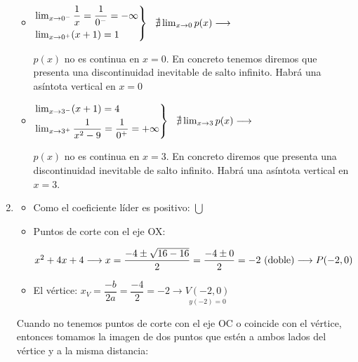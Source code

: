 \begin{enumerate}[label=\color{red}\textbf{\arabic*)}, leftmargin=*]
\begin{itemize}[label=]
	\item {}
	\begin{center}
		$\begin{rcases}
			\lim_{x\to0^-}\dfrac{1}{x}=\dfrac{1}{0^-}=-\infty\\
			\lim_{x\to0^+}(x+1)=1
		\end{rcases}~~\nexists \lim_{x\to0}p(x)\longrightarrow~~$\begin{minipage}[t]{0.4\textwidth}
		$p(x)$ no es continua en $x=0$. En concreto tenemos diremos que presenta una discontinuidad inevitable de salto infinito. Habrá una asíntota vertical en $x=0$
		\end{minipage}
	\end{center}
	\item {}
	\begin{center}
		$\begin{rcases}
			\lim_{x\to3^-}(x+1)=4\\
			\lim_{x\to3^+}\dfrac{1}{x^2-9}=\dfrac{1}{0^+}=+\infty
		\end{rcases}~~\nexists \lim_{x\to3}p(x)\longrightarrow$\begin{minipage}[t]{0.4\textwidth}
		$p(x)$ no es continua en $x=3$. En concreto diremos que presenta una discontinuidad inevitable de salto infinito. Habrá una asíntota vertical en $x=3$.
		\end{minipage}
	\end{center}
\end{itemize}
\item {}

\begin{minipage}{0.45\textwidth}
	\begin{itemize}[leftmargin=*]
		\item Como el coeficiente líder es positivo: $\bigcup$
		\item Puntos de corte con el eje OX:
		\begin{center}
			$ x^2+4x+4\longrightarrow x=\dfrac{-4\pm\sqrt{16-16}}{2}\linebreak=\dfrac{-4\pm0}{2}=-2\text{ (doble)}\longrightarrow P(-2,0) $
		\end{center}
		\item El vértice: $x_V=\dfrac{-b}{2a}=\dfrac{-4}{2}=-2\longrightarrow \underset{y(-2)=0}{V(-2,0)}$
	\end{itemize}
	Cuando no tenemos puntos de corte con el eje OC o coincide con el vértice, entonces tomamos la imagen de dos puntos que estén a ambos lados del vértice y a la misma distancia:
\end{minipage}\qquad\begin{minipage}{0.45\textwidth}
\end{minipage}
\end{enumerate}
